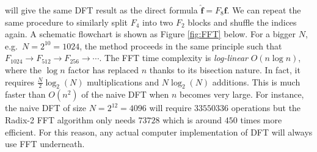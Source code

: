 will give the same DFT result as the direct formula $\hat{\textbf{f}} = F_8\textbf{f}$. We can repeat the same procedure to similarly split $F_4$ into two $F_2$ blocks and shuffle the indices again. A schematic flowchart is shown as Figure \ref{fig:FFT} below. For a bigger $N$, e.g.\ $N = 2^{10} = 1024$, the method proceeds in the same principle such that $F_{1024} \to F_{512} \to F_{256} \to \cdots$. The FFT time complexity is \textit{log-linear} $O(n \log n)$, where the $\log n$ factor has replaced $n$ thanks to its bisection nature. In fact, it requires $\frac{N}{2}\log_2(N)$ multiplications and $N\log_2(N)$ additions. This is much faster than $O(n^2)$ of the naive DFT when $n$ becomes very large. For instance, the naive DFT of size $N = 2^{12} = 4096$ will require $33550336$ operations but the Radix-2 FFT algorithm only needs $73728$ which is around $450$ times more efficient. For this reason, any actual computer implementation of DFT will always use FFT underneath.

